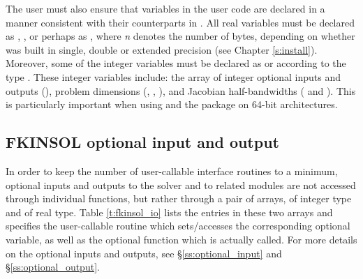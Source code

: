 The user must also ensure that variables in the user {\F} code are
declared in a manner consistent with their counterparts in {\kinsol}.
All real variables must be declared as , ,
or perhaps as , where {\em n} denotes the number of bytes,
depending on whether {\kinsol} was built in single, double or extended precision 
(see Chapter \ref{s:install}). Moreover, some of the {\F} integer variables
must be declared as  or  according to the 
{\C} type . These integer variables include: the array
of integer optional inputs and outputs (), problem dimensions (,
, ), and Jacobian half-bandwidths ( and ).
This is particularly important when using
{\kinsol} and the {\fkinsol} package on 64-bit architectures.



\subsection{FKINSOL optional input and output}
In order to keep the number of user-callable {\fkinsol} interface routines to
a minimum, optional inputs and outputs to the {\kinsol} solver and to related 
modules are not accessed through individual functions, but rather through a
pair of arrays,  of integer type and  of real type.
Table \ref{t:fkinsol_io} lists the entries in these two arrays and specifies the
{\fkinsol} user-callable routine which sets/accesses the corresponding optional
variable, as well as the {\kinsol} optional function which is actually called.
For more details on the optional inputs and outputs, see \S\ref{ss:optional_input}
and \S\ref{ss:optional_output}.

